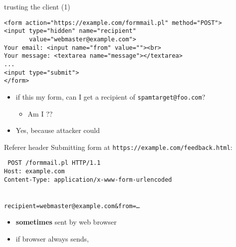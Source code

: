 
\begin{frame}[fragile,label=trustCli1]{trusting the client (1)}
\begin{verbatim}
<form action="https://example.com/formmail.pl" method="POST">
<input type="hidden" name="recipient"
       value="webmaster@example.com">
Your email: <input name="from" value=""><br>
Your message: <textarea name="message"></textarea>
...
<input type="submit">
</form>
\end{verbatim}
    \begin{itemize}
        \item if this my form, can I get a recipient of \texttt{spamtarget@foo.com}?
            \begin{itemize}
                \item Am I ??
            \end{itemize}
        \item<2> Yes, because attacker could 
    \end{itemize}
\end{frame}
\begin{frame}[fragile,label=RefererHeader]{Referer header}
Submitting form at \texttt{https://example.com/feedback.html}:
\begin{framed}
\tt\small
POST /formmail.pl HTTP/1.1 \\
Host: example.com \\
Content-Type: application/x-www-form-urlencoded \\
 \\
~ \\
recipient=webmaster@example.com\&from=\ldots \\
\end{framed}
    \begin{itemize}
        \item \textbf{sometimes} sent by web browser
        \item if browser always sends, 
    \end{itemize}
\end{frame}

